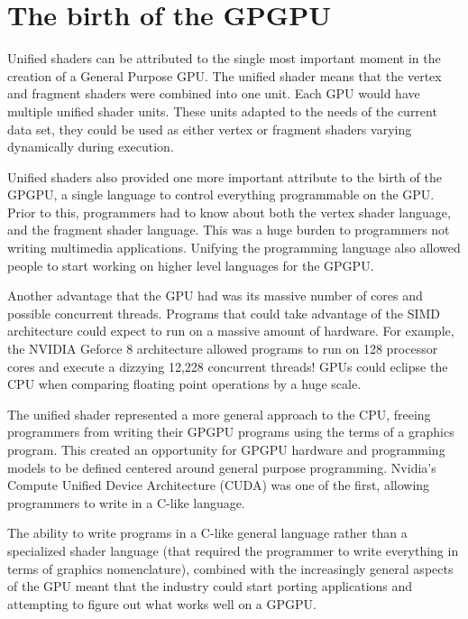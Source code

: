\section*{The birth of the GPGPU}

Unified shaders can be attributed to the single most important moment in the creation of a General Purpose GPU. The unified shader means that the vertex and fragment shaders were combined into one unit. Each GPU would have multiple unified shader units. These units adapted to the needs of the current data set, they could be used as either vertex or fragment shaders varying dynamically during execution. 

Unified shaders also provided one more important attribute to the birth of the GPGPU, a single language to control everything programmable on the GPU. Prior to this, programmers had to know about both the vertex shader language, and the fragment shader language. This was a huge burden to programmers not writing multimedia applications. Unifying the programming language also allowed people to start working on higher level languages for the GPGPU. \cite{gpucomputing}

Another advantage that the GPU had was its massive number of cores and possible concurrent threads.  Programs that could take advantage of the SIMD architecture could expect to run on a massive amount of hardware. For example, the NVIDIA Geforce 8 architecture allowed programs to run on 128 processor cores and execute a dizzying 12,228 concurrent threads! GPUs could eclipse the CPU when comparing floating point operations by a huge scale. \cite{emergingtech}

The unified shader represented a more general approach to the CPU, freeing programmers from writing their GPGPU programs using the terms of a graphics program. This created an opportunity for GPGPU hardware and programming models to be defined centered around general purpose programming. Nvidia's Compute Unified Device Architecture (CUDA) was one of the first, allowing programmers to write in a C-like language. 

The ability to write programs in a C-like general language rather than a specialized shader language (that required the programmer to write everything in terms of graphics nomenclature), combined with the increasingly general aspects of the GPU meant that the industry could start porting applications and attempting to figure out what works well on a GPGPU. 

